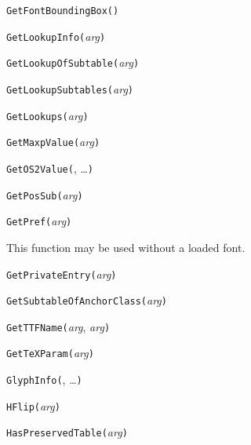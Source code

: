 \noindent\texttt{GetFontBoundingBox(}\texttt{)}


\noindent\texttt{GetLookupInfo(}\textit{arg}\texttt{)}


\noindent\texttt{GetLookupOfSubtable(}\textit{arg}\texttt{)}


\noindent\texttt{GetLookupSubtables(}\textit{arg}\texttt{)}


\noindent\texttt{GetLookups(}\textit{arg}\texttt{)}


\noindent\texttt{GetMaxpValue(}\textit{arg}\texttt{)}


\noindent\texttt{GetOS2Value(}, \ldots\texttt{)}


\noindent\texttt{GetPosSub(}\textit{arg}\texttt{)}


\noindent\texttt{GetPref(}\textit{arg}\texttt{)}

This function may be used without a loaded font.


\noindent\texttt{GetPrivateEntry(}\textit{arg}\texttt{)}


\noindent\texttt{GetSubtableOfAnchorClass(}\textit{arg}\texttt{)}


\noindent\texttt{GetTTFName(}\textit{arg}, \textit{arg}\texttt{)}


\noindent\texttt{GetTeXParam(}\textit{arg}\texttt{)}


\noindent\texttt{GlyphInfo(}, \ldots\texttt{)}


\noindent\texttt{HFlip(}\textit{arg}\texttt{)}


\noindent\texttt{HasPreservedTable(}\textit{arg}\texttt{)}

